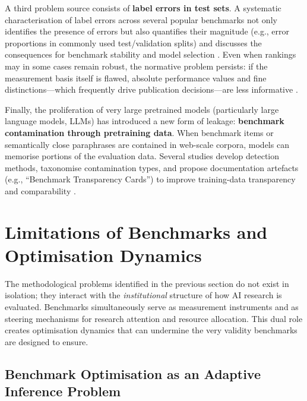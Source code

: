 \documentclass[12pt, a4paper]{article}
\begin{document}
A third problem source consists of \textbf{label errors in test sets}.
A systematic characterisation of label errors across several popular
benchmarks not only identifies the presence of errors but also
quantifies their magnitude (e.g., error proportions in commonly used
test/validation splits) and discusses the consequences for benchmark
stability and model selection \cite{Northcutt2021}.  Even when rankings
may in some cases remain robust, the normative problem persists: if the
measurement basis itself is flawed, absolute performance values and fine
distinctions---which frequently drive publication decisions---are less
informative \cite{Northcutt2021}.

Finally, the proliferation of very large pretrained models (particularly
large language models, LLMs) has introduced a new form of leakage:
\textbf{benchmark contamination through pretraining data}.  When
benchmark items or semantically close paraphrases are contained in
web-scale corpora, models can memorise portions of the evaluation data.
Several studies develop detection methods, taxonomise contamination
types, and propose documentation artefacts (e.g., ``Benchmark
Transparency Cards'') to improve training-data transparency and
comparability \cite{XuR2024,XuC2024,Choi2025}.

\section{Limitations of Benchmarks and Optimisation Dynamics}
\label{sec:benchmarks}

The methodological problems identified in the previous section do not
exist in isolation; they interact with the \emph{institutional}
structure of how AI research is evaluated.  Benchmarks simultaneously
serve as measurement instruments and as steering mechanisms for research
attention and resource allocation.  This dual role creates optimisation
dynamics that can undermine the very validity benchmarks are designed to
ensure.

\subsection{Benchmark Optimisation as an Adaptive Inference Problem}
\label{sec:adaptive}
\end{document}
